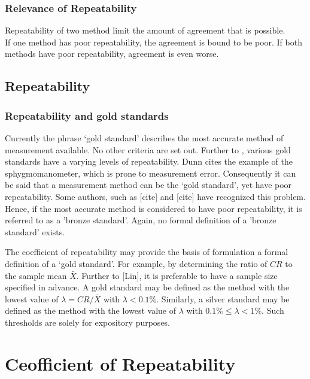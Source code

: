 \documentclass[Chap2cmain.tex]{subfiles}
\begin{document}
\subsection{Relevance of Repeatability} 
Repeatability of two method limit the amount of agreement that is possible.\\
If one method has poor repeatability, the agreement is bound to be poor. If both methods have poor repeatability, agreement is
even worse.


\section{Repeatability}
\subsection{Repeatability and gold standards}
Currently the phrase `gold standard' describes the most accurate method of measurement available. No other criteria are set out. Further to \citet{dunnSEME}, various gold standards have a varying levels of repeatability. Dunn cites the example of the sphygmomanometer, which is prone to measurement error. Consequently it can be said that a measurement method can be the `gold standard', yet have poor repeatability. Some authors, such as [cite] and [cite] have recognized this problem. Hence, if the most accurate method is considered to have poor repeatability, it is referred to as a 'bronze standard'.  Again, no formal definition of a 'bronze standard' exists.

The coefficient of repeatability may provide the basis of formulation a formal definition of a `gold standard'. For example, by determining the ratio of $CR$ to the sample mean $\bar{X}$. Further to [Lin], it is preferable to have a sample size specified in advance. A gold standard may be defined as the method with the lowest value of $\lambda = CR /\bar{X}$ with $\lambda < 0.1\%$. Similarly, a silver standard may be defined as the method with the lowest value of $\lambda $ with $0.1\% \leq \lambda < 1\%$. Such thresholds are solely for expository purposes.



\chapter{Ceofficient of Repeatability}
\end{document}

